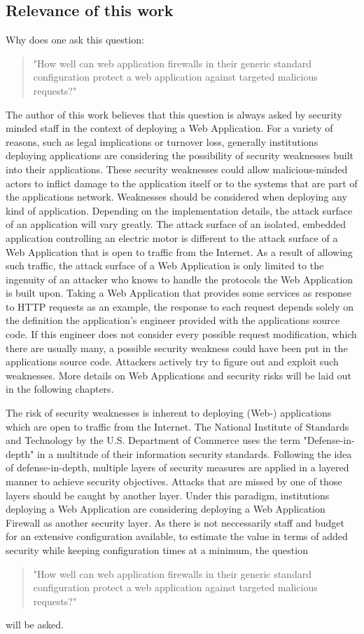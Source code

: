 \subsection{Relevance of this work}
Why does one ask this question:
\begin{quote} "How well can web application firewalls in their generic standard configuration protect a web application against targeted malicious requests?" 
\end{quote}
The author of this work believes that this question is always asked by security minded staff in the context of deploying a Web Application. 
For a variety of reasons, such as legal implications or turnover loss, generally institutions deploying applications are considering the possibility of security weaknesses built into their applications. These security weaknesses could allow malicious-minded actors to inflict damage to the application itself or to the systems that are part of the applications network. Weaknesses should be considered when deploying any kind of application. Depending on the implementation details, the attack surface of an application will vary greatly. The attack surface of an isolated, embedded application controlling an electric motor is different to the attack surface of a Web Application that is open to traffic from the Internet. As a result of allowing such traffic, the attack surface of a Web Application is only limited to the ingenuity of an attacker who knows to handle the protocols the Web Application is built upon. Taking a Web Application that provides some services as response to HTTP requests as an example, the response to each request depends solely on the definition the application's engineer provided with the applications source code. If this engineer does not consider every possible request modification, which there are usually many, a possible security weakness could have been put in the applications source code. Attackers actively try to figure out and exploit such weaknesses. More details on Web Applications and security risks will be laid out in the following chapters.

The risk of security weaknesses is inherent to deploying (Web-) applications which are open to traffic from the Internet. The National Institute of Standards and Technology by the U.S. Department of Commerce uses the term "Defense-in-depth" in a multitude of their information security standards. 
Following the idea of defense-in-depth, multiple layers of security measures are applied in a layered manner to achieve security objectives. Attacks that are missed by one of those layers should be caught by another layer. \cite{nist/did}
Under this paradigm, institutions deploying a Web Application are considering deploying a Web Application Firewall as another security layer. As there is not neccessarily staff and budget for an extensive configuration available, to estimate the value in terms of added security while keeping configuration times at a minimum, the question
\begin{quote} "How well can web application firewalls in their generic standard configuration protect a web application against targeted malicious requests?" 
\end{quote}
will be asked.
